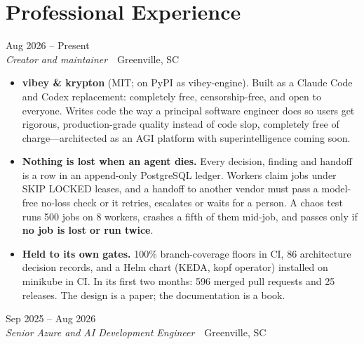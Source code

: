 \documentclass[10pt,letterpaper]{article}
\newcommand{\szmeta}{\fontsize{8pt}{10pt}\selectfont}
\begin{document}
\section*{Professional Experience}
\vspace{0pt}
 \hfill {\color{muted}\szmeta Aug 2026 – Present}\\[1pt]
{\itshape Creator and maintainer}{\color{muted}\ \textbullet\ Greenville, SC}
\vspace{2pt}
\begin{itemize}
\item \textbf{vibey \& krypton} {\color{muted}(MIT; on PyPI as vibey-engine)}. Built as a Claude Code and Codex replacement: completely free, censorship-free, and open to everyone. Writes code the way a principal software engineer does so users get rigorous, production-grade quality instead of code slop, completely free of charge—architected as an AGI platform with superintelligence coming soon.
\item \textbf{Nothing is lost when an agent dies.} Every decision, finding and handoff is a row in an append-only PostgreSQL ledger. Workers claim jobs under SKIP LOCKED leases, and a handoff to another vendor must pass a model-free no-loss check or it retries, escalates or waits for a person. A chaos test runs 500 jobs on 8 workers, crashes a fifth of them mid-job, and passes only if \textbf{no job is lost or run twice}.
\item \textbf{Held to its own gates.} 100\% branch-coverage floors in CI, 86 architecture decision records, and a Helm chart (KEDA, kopf operator) installed on minikube in CI. In its first two months: 596 merged pull requests and 25 releases. The design is a paper; the documentation is a book.
\end{itemize}
\vspace{3pt}
 \hfill {\color{muted}\szmeta Sep 2025 – Aug 2026}\\[1pt]
{\itshape Senior Azure and AI Development Engineer}{\color{muted}\ \textbullet\ Greenville, SC}
\vspace{2pt}
\end{document}
